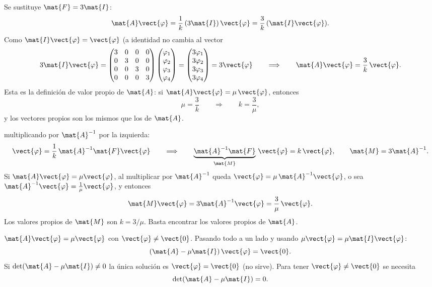 Se sustituye $\mat{F} = 3\mat{I}$:
\[
\mat{A}\vect{\varphi} = \frac1k\,(3\mat{I})\,\vect{\varphi} = \frac3k\,(\mat{I}\vect{\varphi}) .
\]
Como $\mat{I}\vect{\varphi} = \vect{\varphi}$ (a identidad no cambia al vector
\[
3\mat{I}\vect{\varphi} =
\begin{pmatrix} 3 & 0 & 0 & 0\\ 0 & 3 & 0 & 0\\ 0 & 0 & 3 & 0\\ 0 & 0 & 0 & 3 \end{pmatrix}
\begin{pmatrix} \varphi_1\\ \varphi_2\\ \varphi_3\\ \varphi_4 \end{pmatrix}
= \begin{pmatrix} 3\varphi_1\\ 3\varphi_2\\ 3\varphi_3\\ 3\varphi_4 \end{pmatrix} = 3\vect{\varphi}
\qquad\Longrightarrow\qquad
\mat{A}\vect{\varphi} = \frac3k\,\vect{\varphi} .
\]
Esta es la definición de valor propio de $\mat{A}$: si $\mat{A}\vect{\varphi} = \mu\,\vect{\varphi}$, entonces
\[
\mu = \frac3k \qquad\Longrightarrow\qquad k = \frac{3}{\mu},
\]
y los vectores propios son los mismos que los de $\mat{A}$.

multiplicando por $\mat{A}^{-1}$ por la izquierda:
\[
\vect{\varphi} = \frac1k\,\mat{A}^{-1}\mat{F}\vect{\varphi}
\qquad\Longrightarrow\qquad
\underbrace{\mat{A}^{-1}\mat{F}}_{\mat{M}}\,\vect{\varphi} = k\,\vect{\varphi},
\qquad \mat{M} = 3\mat{A}^{-1} .
\]
Si $\mat{A}\vect{\varphi} = \mu\vect{\varphi}$, al multiplicar por $\mat{A}^{-1}$ queda $\vect{\varphi} = \mu\,\mat{A}^{-1}\vect{\varphi}$, o sea
$\mat{A}^{-1}\vect{\varphi} = \frac1\mu\vect{\varphi}$, y entonces
\[
\mat{M}\vect{\varphi} = 3\mat{A}^{-1}\vect{\varphi} = \frac3\mu\,\vect{\varphi} .
\]
Los valores propios de $\mat{M}$ son $k = 3/\mu$. Basta encontrar los valores propios de $\mat{A}$.

$\mat{A}\vect{\varphi} = \mu\vect{\varphi}$ con $\vect{\varphi} \neq \vect{0}$. Pasando todo a un lado y usando
$\mu\vect{\varphi} = \mu\mat{I}\vect{\varphi}$:
\[
(\mat{A} - \mu\mat{I})\,\vect{\varphi} = \vect{0} .
\]
Si $\det(\mat{A} - \mu\mat{I}) \neq 0$ la única solución es $\vect{\varphi} = \vect{0}$ (no sirve). Para tener
$\vect{\varphi} \neq \vect{0}$ se necesita
\[
\det(\mat{A} - \mu\mat{I}) = 0 .
\]


